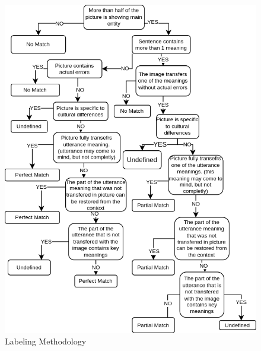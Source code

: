 \begin{figure}[h]
\centering
\includegraphics[scale=0.5]{method3.png}
\caption{Labeling Methodology}
\label{LabelingMethod}
\end{figure}
